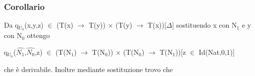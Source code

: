 \subsubsection{Corollario}
Da q$_{U_0}$(x,y,z) $\in$ (T(x) $\rightarrow$ T(y)) $\times$ (T(y) $\rightarrow$ T(x))[$\Delta$] sostituendo x con N$_1$ e y con N$_0$ ottengo \begin{center} q$_{U_0}$($\hat{N_1}$,$\hat{N_0}$,z) $\in$ (T(N$_1$) $\rightarrow$ T(N$_0$)) $\times$ (T(N$_0$) $\rightarrow$ T(N$_1$))[z $\in$ Id(Nat,0,1)] \end{center} che \`e derivabile. Inoltre mediante sostituzione trovo che
\scriptsize
\begin{adjustwidth}{-6em}{}
\begin{prooftree}
\end{prooftree}
\end{adjustwidth}

